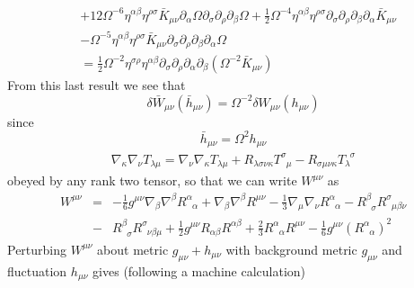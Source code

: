 \documentclass[10pt,letterpaper]{article}
\newcommand{\be}{\begin{equation}} %
\newcommand{\ee}{\end{equation}} %
\newcommand{\pd}{\partial}
\begin{document}
\begin{align}
 & + 12\Omega^{-6} \eta^{\alpha \beta} \eta^{\rho \sigma} \bar K_{\mu \nu} \partial_{\alpha}\Omega \partial_{\sigma}\partial_{\rho}\partial_{\beta}\Omega + \tfrac{1}{2}\Omega^{-4} \eta^{\alpha \beta} \eta^{\rho \sigma} \partial_{\sigma}\partial_{\rho}\partial_{\beta}\partial_{\alpha}\bar K_{\mu \nu}\nonumber \\
 &-  \Omega^{-5}\eta^{\alpha \beta} \eta^{\rho \sigma} \bar K_{\mu \nu} \partial_{\sigma}\partial_{\rho}\partial_{\beta}\partial_{\alpha}\Omega \nonumber \\
&= \frac12 \Omega^{-2} \eta^{\sigma\rho}\eta^{\alpha\beta}\pd_\sigma\pd_\rho\pd_\alpha \pd_\beta (\Omega^{-2}\bar K_{\mu\nu}) 
\end{align}
From this last result we see that 
\be
	\delta \bar W_{\mu\nu}(\bar h_{\mu\nu}) = \Omega^{-2}\delta W_{\mu\nu}(h_{\mu\nu})
\ee
since
\[
	\bar h_{\mu\nu} = \Omega^2 h_{\mu\nu}
\]
%
\begin{eqnarray}
\nabla_{\kappa}\nabla_{\nu}T_{\lambda \mu}=\nabla_{\nu}\nabla_{\kappa}T_{\lambda \mu}+R_{\lambda\sigma\nu\kappa}T^{\sigma}_{\phantom{\sigma}\mu}-R_{\sigma\mu\nu\kappa}T_{\lambda}^{\phantom{\lambda}\sigma}
\label{AP41}
\end{eqnarray}
%
obeyed by any rank two tensor, so that we can write $W^{\mu\nu}$ as 
%                                                                               
\begin{eqnarray}
W^{\mu \nu}&=&
-\frac{1}{6}g^{\mu\nu}\nabla_{\beta}\nabla^{\beta}R^{\alpha}_{\phantom{\alpha}\alpha}
+\nabla_{\beta}\nabla^{\beta}R^{\mu\nu}                    
 -\frac{1}{3}\nabla_{\mu}\nabla_{\nu}R^{\alpha}_{\phantom{\alpha}\alpha}  
 -R^{\beta}_{\phantom{\beta}\sigma} R^{\sigma}_{\phantom{\sigma}\mu\beta\nu}   
  \nonumber\\
 &-&R^{\beta}_{\phantom{\beta}\sigma} R^{\sigma}_{\phantom{\sigma}\nu\beta\mu}  
+\frac{1}{2}g^{\mu\nu}R_{\alpha\beta}R^{\alpha\beta}                                            
+\frac{2}{3}R^{\alpha}_{\phantom{\alpha}\alpha}R^{\mu\nu}                              
-\frac{1}{6}g^{\mu\nu}(R^{\alpha}_{\phantom{\alpha}\alpha})^2
\label{AP42}
\end{eqnarray}                                 
%
Perturbing $W^{\mu\nu}$ about metric $g_{\mu\nu}+h_{\mu\nu}$ with background metric $g_{\mu\nu}$ and fluctuation $h_{\mu\nu}$ gives (following a machine calculation)
\end{document}
